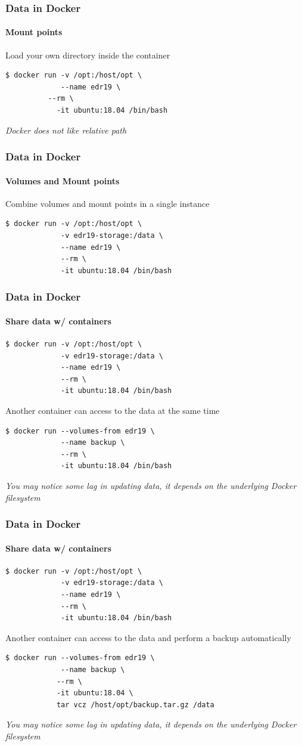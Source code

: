\begin{frame}[fragile]
\frametitle{Data in Docker}
\framesubtitle{Mount points}

Load your own directory inside the container

\begin{lstlisting}
$ docker run -v /opt:/host/opt \
             --name edr19 \
	      --rm \
            -it ubuntu:18.04 /bin/bash

\end{lstlisting}

\it{Docker does not like relative path}
\end{frame}

\begin{frame}[fragile]
\frametitle{Data in Docker}
\framesubtitle{Volumes and Mount points}

Combine volumes and mount points in a single instance

\begin{lstlisting}
$ docker run -v /opt:/host/opt \
             -v edr19-storage:/data \
             --name edr19 \
             --rm \
             -it ubuntu:18.04 /bin/bash
\end{lstlisting}
\end{frame}

\begin{frame}[fragile]
\frametitle{Data in Docker}
\framesubtitle{Share data w/ containers}


\begin{lstlisting}
$ docker run -v /opt:/host/opt \
             -v edr19-storage:/data \
             --name edr19 \
             --rm \
             -it ubuntu:18.04 /bin/bash

\end{lstlisting}
Another container can access to the data at the same time
\begin{lstlisting}
$ docker run --volumes-from edr19 \
             --name backup \
             --rm \
             -it ubuntu:18.04 /bin/bash
\end{lstlisting}
\it{You may notice some lag in updating data, it depends on the underlying Docker filesystem}
\end{frame}

\begin{frame}[fragile]
\frametitle{Data in Docker}
\framesubtitle{Share data w/ containers}

\scriptsize
\begin{lstlisting}
$ docker run -v /opt:/host/opt \
             -v edr19-storage:/data \
             --name edr19 \
             --rm \
             -it ubuntu:18.04 /bin/bash
\end{lstlisting}
\normalsize
Another container can access to the data and perform a backup automatically
\scriptsize
\begin{lstlisting}
$ docker run --volumes-from edr19 \
             --name backup \
            --rm \
            -it ubuntu:18.04 \
            tar vcz /host/opt/backup.tar.gz /data
\end{lstlisting}
\normalsize
\it{You may notice some lag in updating data, it depends on the underlying Docker filesystem}
\end{frame}

